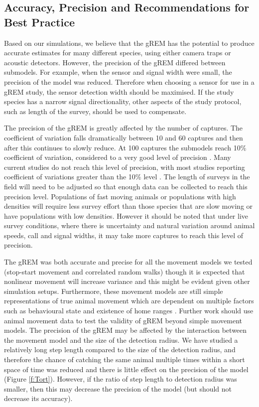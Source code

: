 \documentclass[a4paper,10pt,reqno,oneside]{amsart}
\begin{document}
\subsection*{Accuracy, Precision and Recommendations for Best Practice}
Based on our simulations, we believe that the gREM has the potential to produce accurate estimates for many different species, using either camera traps or acoustic detectors. However, the precision of the gREM differed between submodels. For example, when the sensor and signal width were small, the precision of the model was reduced. Therefore when choosing a sensor for use in a gREM study, the sensor detection width should be maximised. If the study species has a narrow signal directionality, other aspects of the study protocol, such as length of the survey, should be used to compensate. 

The precision of the gREM is greatly affected by the number of captures. The coefficient of variation falls dramatically between 10 and 60 captures and then after this continues to slowly reduce. At 100 captures the submodels reach 10\% coefficient of variation, considered to a very good level of precision \citep{thomas2012passive}. Many current studies do not reach this level of precision, with most studies reporting coefficient of variations greater than the 10\% level \citep{o2003crouching, proctor2010ecological, foster2012critique}. The length of surveys in the field will need to be adjusted so that enough data can be collected to reach this precision level. Populations of fast moving animals or populations with high densities will require less survey effort than those species that are slow moving or have populations with low densities. However it should be noted that under live survey conditions, where there is uncertainty and natural variation around animal speeds, call and signal widths, it may take more captures to reach this level of precision.  

The gREM was both accurate and precise for all the movement models we tested (stop-start movement and correlated random walks) though it is expected that nonlinear movement will increase variance \citep{Hutchinson_Waser_2007} and this might be evident given other simulation setups. Furthermore, these movement models are still simple representations of true animal movement which are dependent on multiple factors such as behavioural state and existence of home ranges \citep{smouse2010stochastic}. Further work should use animal movement data to test the validity of gREM beyond simple movement models. The precision of the gREM may be affected by the interaction between the movement model and the size of the detection radius. We have studied a relatively long step length compared to the size of the detection radius, and therefore the chance of catching the same animal multiple times within a short space of time was reduced and there is little effect on the precision of the model (Figure \ref{f:Tort}). However, if the ratio of step length to detection radius was smaller, then this may decrease the precision of the model (but should not decrease its accuracy). 
\end{document}
